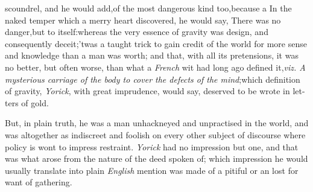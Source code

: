 \documentclass{article}
\begin{document}
\noindent
{}
scoundrel, and he would add,\tsk of the
most dangerous kind too,\tsk because a\break
{} 
In the naked temper which a merry heart discovered, he would say, There was no
danger,\tsk but to itself:\tsk whereas the very essence of gravity was design, and
consequently deceit;\tsk ’twas a taught trick to gain credit of the world for more
sense and knowledge than a man was worth; and that, with all its pretensions,\tsk
it was no better, but often worse, than what a \textit{French} wit had long ago
defined it,\tsk \textit{viz. A mysterious carriage of the body to cover the defects
of the mind};\tsk which definition of gravity, \textit{Yorick}, with great
imprudence, would say, deserved to be wrote in let-\break ters of gold.

But, in plain truth, he was a man unhackneyed and unpractised in
the world, and was altogether as indiscreet and foolish on every
other subject of discourse where policy is wont to impress
restraint. \textit{Yorick} had no impression but one, and that was
what arose from the nature of the deed spoken of; which impression
he would usually translate into plain \textit{English}
mention was made of a pitiful or an 
lost for want of gathering.
\end{document}
